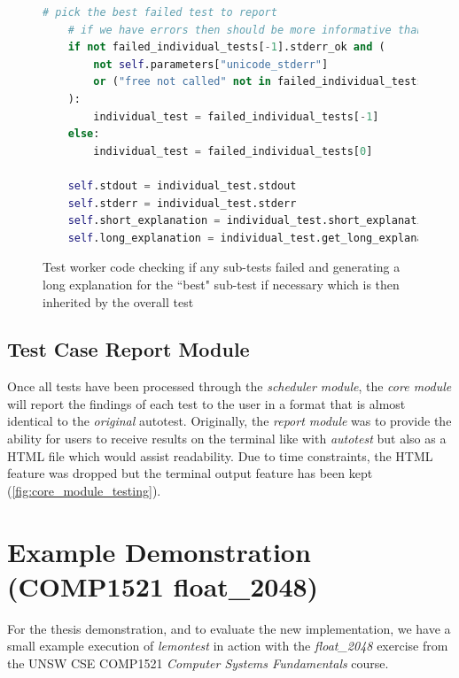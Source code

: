 \documentclass[hidelinks]{report}
\begin{document}
\begin{enumerate}
\begin{figure}[h]
\begin{lstlisting}[language=python, breaklines=true, linewidth=\linewidth, tabsize=4]
    # pick the best failed test to report
    # if we have errors then should be more informative than incorrect output except memory leaks
    if not failed_individual_tests[-1].stderr_ok and (
        not self.parameters["unicode_stderr"]
        or ("free not called" not in failed_individual_tests[-1].stderr)
    ):
        individual_test = failed_individual_tests[-1]
    else:
        individual_test = failed_individual_tests[0]

    self.stdout = individual_test.stdout
    self.stderr = individual_test.stderr
    self.short_explanation = individual_test.short_explanation
    self.long_explanation = individual_test.get_long_explanation()
		\end{lstlisting}
		\caption{Test worker code checking if any sub-tests failed and generating a long explanation for the ``best" sub-test if necessary which is then inherited by the overall test}
		\label{fig:testLong}
	\end{figure}
\end{enumerate}
\subsection{Test Case Report Module}
Once all tests have been processed through the \textit{scheduler module}, the \textit{core module} will report the findings of each test to the user in a format that is almost identical to the \textit{original} autotest. Originally, the \textit{report module} was to provide the ability for users to receive results on the terminal like with \textit{autotest} but also as a HTML file which would assist readability. Due to time constraints, the HTML feature was dropped but the terminal output feature has been kept (\autoref{fig:core_module_testing}).

\clearpage
\section{Example Demonstration (COMP1521 float\_2048)}
For the thesis demonstration, and to evaluate the new implementation, we have a small example execution of \textit{lemontest} in action with the \textit{float\_2048} exercise from the UNSW CSE COMP1521 \textit{Computer Systems Fundamentals} course.
\end{document}
